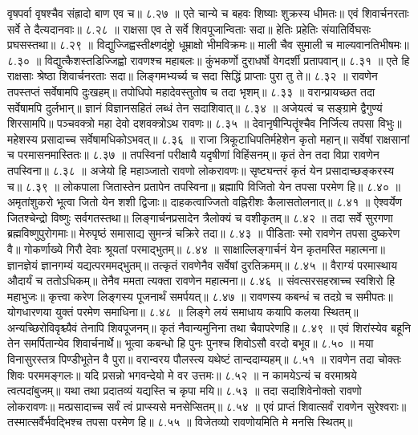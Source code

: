 वृषपर्वा वृषश्चैव संह्रादो बाण एव च॥ ८.२७ ॥
एते चान्ये च बहवः शिष्याः शुक्रस्य धीमतः॥
एवं शिवार्चनरताः सर्वे ते दैत्यदानवाः॥ ८.२८ ॥
राक्षसा एव ते सर्वे शिवपूजान्विताः सदा॥
हेतिः प्रहेतिः संयातिर्विघसः प्रघसस्तथा॥ ८.२९ ॥
विद्युज्जिह्वस्तीक्ष्णदंष्ट्रो धूम्राक्षो भीमविक्रमः॥
माली चैव सुमाली च माल्यवानतिभीषमः॥ ८.३० ॥
विद्युत्कैशस्तडिज्जिह्वो रावणश्च महाबलः॥
कुंभकर्णो दुराधर्षो वेगदर्शी प्रतापवान्॥ ८.३१ ॥
एते हि राक्षसाः श्रेष्ठा शिवार्चनरताः सदा॥
लिङ्गमभ्यर्च्य च सदा सिद्धिं प्राप्ताः पुरा तु ते॥ ८.३२ ॥
रावणेन तपस्तप्तं सर्वेषामपि दुःखहम्॥
तपोधिपो महादेवस्तुतोष च तदा भृशम्॥ ८.३३ ॥
वरान्प्रायच्छत तदा सर्वेषामपि दुर्लभान्॥
ज्ञानं विज्ञानसहितं लब्धं तेन सदाशिवात्॥ ८.३४ ॥
अजेयत्वं च सङ्ग्रामे द्वैगुण्यं शिरसामपि॥
पञ्चवक्त्रो महा देवो दशवक्त्रोऽथ रावणः॥ ८.३५ ॥
देवानृषीन्पितॄंश्चैव निर्जित्य तपसा विभुः॥
महेशस्य प्रसादाच्च सर्वेषामधिकोऽभवत्॥ ८.३६ ॥
राजा त्रिकूटाधिपतिर्महेशेन कृतो महान्॥
सर्वेषां राक्षसानां च परमासनमास्तितः॥ ८.३७ ॥
तपस्विनां परीक्षायै यदृषीणां विहिंसनम्॥
कृतं तेन तदा विप्रा रावणेन तपस्विना॥ ८.३८ ॥
अजेयो हि महाञ्जातो रावणो लोकरावणः॥
सृष्ट्यन्तरं कृतं येन प्रसादाच्छङ्करस्य च॥ ८.३९ ॥
लोकपाला जितास्तेन प्रतापेन तपस्विना॥
ब्रह्मापि विजितो येन तपसा परमेण हि॥ ८.४० ॥
अमृतांशुकरो भूत्वा जितो येन शशी द्विजाः॥
दाहकत्वाज्जितो वह्निरीशः कैलासतोलनात्॥ ८.४१ ॥
ऐश्वर्येण जितश्चेन्द्रो विष्णुः सर्वगतस्तथा॥
लिङ्गार्चनप्रसादेन त्रैलोक्यं च वशीकृतम्॥ ८.४२ ॥
तदा सर्वे सुरगणा ब्रह्मविष्णुपुरोगमाः॥
मेरुपृष्ठं समासाद्य सुमन्त्रं चक्रिरे तदा॥ ८.४३ ॥
पीडिताः स्मो रावणेन तपसा दुष्करेण वै॥
गोकर्णाख्ये गिरौ देवाः श्रूयतां परमाद्भुतम्॥ ८.४४ ॥
साक्षाल्लिङ्गार्चनं येन कृतमस्ति महात्मना॥
ज्ञानज्ञेयं ज्ञानगम्यं यद्यत्परममद्भुतम्॥
तत्कृतं रावणेनैव सर्वेषां दुरतिक्रमम्॥ ८.४५ ॥
वैराग्यं परमास्थाय औदार्यं च ततोऽधिकम्॥
तेनैव ममता त्यक्ता रावणेन महात्मना॥ ८.४६ ॥
संवत्सरसहस्राच्च स्वशिरो हि महाभुजः॥
कृत्त्वा करेण लिङ्गस्य पूजनार्थं समर्पयत्॥ ८.४७ ॥
रावणस्य कबन्धं च तदग्रे च समीपतः॥
योगधारणया युक्तं परमेण समाधिना॥ ८.४८ ॥
लिङ्गे लयं समाधाय कयापि कलया स्थितम्॥
अन्यच्छिरोविवृश्च्यैवं तेनापि शिवपूजनम्॥
कृतं नैवान्यमुनिना तथा चैवापरेणहि॥ ८.४९ ॥
एवं शिरांस्येव बहूनि तेन समर्पितान्येव शिवार्चनार्थे॥
भूत्वा कबन्धो हि पुनः पुनश्च शिवोऽसौ वरदो बभूव॥ ८.५० ॥
मया विनासुरस्तत्र पिण्डीभूतेन वै पुरा॥
वरान्वरय पौलस्त्य यथेष्टं तान्ददाम्यहम्॥ ८.५१ ॥
रावणेन तदा चोक्तः शिवः परममङ्गलः॥
यदि प्रसन्नो भगवन्देयो मे वर उत्तमः॥ ८.५२ ॥
न कामयेऽन्यं च वरमाश्रये त्वत्पदांबुजम्॥
यथा तथा प्रदातव्यं यद्यस्ति च कृपा मयि॥ ८.५३ ॥
तदा सदाशिवेनोक्तो रावणो लोकरावणः॥
मत्प्रसादाच्च सर्वं त्वं प्राप्स्यसे मनसेप्सितम्॥ ८.५४ ॥
एवं प्राप्तं शिवात्सर्वं रावणेन सुरेश्वराः॥
तस्मात्सर्वैर्भवद्भिश्च तपसा परमेण हि॥ ८.५५ ॥
विजेतव्यो रावणोयमिति मे मनसि स्थितम्॥
